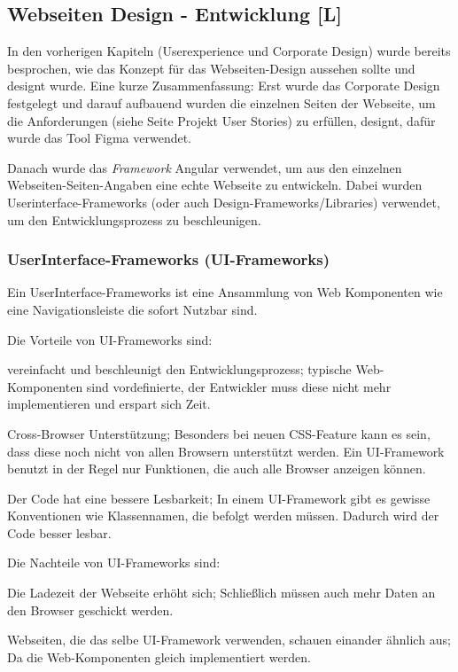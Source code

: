 \subsection{Webseiten Design - Entwicklung [L]}
In den vorherigen Kapiteln (Userexperience und Corporate Design) wurde bereits besprochen, wie das Konzept für das Webseiten-Design aussehen sollte und designt wurde. Eine kurze Zusammenfassung: Erst wurde das Corporate Design festgelegt und darauf aufbauend wurden die einzelnen Seiten der Webseite, um die Anforderungen (siehe Seite \pageref{ch:umsetzung:projekt-user-stories} Projekt User Stories) zu erfüllen, designt, dafür wurde das Tool Figma verwendet.

Danach wurde das \emph{Framework} Angular verwendet, um aus den einzelnen Webseiten-Seiten-Angaben eine echte Webseite zu entwickeln. Dabei wurden Userinterface-Frameworks (oder auch Design-Frameworks/Libraries) verwendet, um den Entwicklungsprozess zu beschleunigen.

\subsubsection{UserInterface-Frameworks (UI-Frameworks)}
Ein UserInterface-Frameworks ist eine Ansammlung von Web Komponenten wie eine Navigationsleiste die sofort Nutzbar sind.  


Die Vorteile von UI-Frameworks sind:
\begin{compactitem}
    \item vereinfacht und beschleunigt den Entwicklungsprozess;
    typische Web-Komponenten sind vordefinierte, der Entwickler muss diese nicht mehr implementieren und erspart sich Zeit.
    \item Cross-Browser Unterstützung;
    Besonders bei neuen CSS-Feature kann es sein, dass diese noch nicht von allen Browsern unterstützt werden. Ein UI-Framework benutzt in der Regel nur Funktionen, die auch alle Browser anzeigen können.
    \item Der Code hat eine bessere Lesbarkeit;
    In einem UI-Framework gibt es gewisse Konventionen wie Klassennamen, die befolgt werden müssen. Dadurch wird der Code besser lesbar.
\end{compactitem}


Die Nachteile von UI-Frameworks sind:
\begin{compactitem}
    \item Die Ladezeit der Webseite erhöht sich;
    Schließlich müssen auch mehr Daten an den Browser geschickt werden.
    \item Webseiten, die das selbe UI-Framework verwenden, schauen einander ähnlich aus;
    Da die Web-Komponenten gleich implementiert werden.
\end{compactitem}
\cite{CssFrameworkExplaination} \cite{BestCSSFrameworksin2022}

